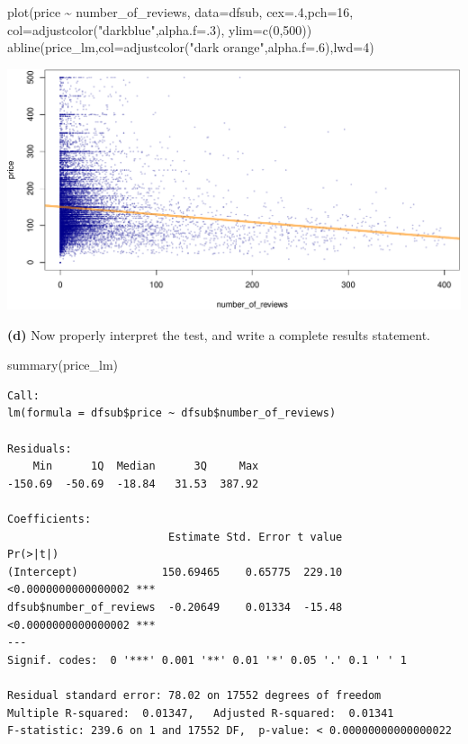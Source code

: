 \documentclass[
]{book}
\newenvironment{Shaded}{\begin{snugshade}}{\end{snugshade}}
\newcommand{\AttributeTok}[1]{\textcolor[rgb]{0.77,0.63,0.00}{#1}}
\newcommand{\DecValTok}[1]{\textcolor[rgb]{0.00,0.00,0.81}{#1}}
\newcommand{\FunctionTok}[1]{\textcolor[rgb]{0.00,0.00,0.00}{#1}}
\newcommand{\NormalTok}[1]{#1}
\newcommand{\SpecialCharTok}[1]{\textcolor[rgb]{0.00,0.00,0.00}{#1}}
\newcommand{\StringTok}[1]{\textcolor[rgb]{0.31,0.60,0.02}{#1}}
\begin{document}
\begin{Shaded}
\begin{Highlighting}[]
\FunctionTok{plot}\NormalTok{(price }\SpecialCharTok{\textasciitilde{}}\NormalTok{ number\_of\_reviews,}
     \AttributeTok{data=}\NormalTok{dfsub,}
     \AttributeTok{cex=}\NormalTok{.}\DecValTok{4}\NormalTok{,}\AttributeTok{pch=}\DecValTok{16}\NormalTok{,}
     \AttributeTok{col=}\FunctionTok{adjustcolor}\NormalTok{(}\StringTok{"darkblue"}\NormalTok{,}\AttributeTok{alpha.f=}\NormalTok{.}\DecValTok{3}\NormalTok{),}
     \AttributeTok{ylim=}\FunctionTok{c}\NormalTok{(}\DecValTok{0}\NormalTok{,}\DecValTok{500}\NormalTok{))}
\FunctionTok{abline}\NormalTok{(price\_lm,}\AttributeTok{col=}\FunctionTok{adjustcolor}\NormalTok{(}\StringTok{"dark orange"}\NormalTok{,}\AttributeTok{alpha.f=}\NormalTok{.}\DecValTok{6}\NormalTok{),}\AttributeTok{lwd=}\DecValTok{4}\NormalTok{)}
\end{Highlighting}
\end{Shaded}

\includegraphics{figures/unnamed-chunk-251-1.pdf}

\textbf{(d)} Now properly interpret the test, and write a complete results statement.

\begin{Shaded}
\begin{Highlighting}[]
\FunctionTok{summary}\NormalTok{(price\_lm)}
\end{Highlighting}
\end{Shaded}

\begin{verbatim}
Call:
lm(formula = dfsub$price ~ dfsub$number_of_reviews)

Residuals:
    Min      1Q  Median      3Q     Max 
-150.69  -50.69  -18.84   31.53  387.92 

Coefficients:
                         Estimate Std. Error t value            Pr(>|t|)    
(Intercept)             150.69465    0.65775  229.10 <0.0000000000000002 ***
dfsub$number_of_reviews  -0.20649    0.01334  -15.48 <0.0000000000000002 ***
---
Signif. codes:  0 '***' 0.001 '**' 0.01 '*' 0.05 '.' 0.1 ' ' 1

Residual standard error: 78.02 on 17552 degrees of freedom
Multiple R-squared:  0.01347,   Adjusted R-squared:  0.01341 
F-statistic: 239.6 on 1 and 17552 DF,  p-value: < 0.00000000000000022
\end{verbatim}
\end{document}
